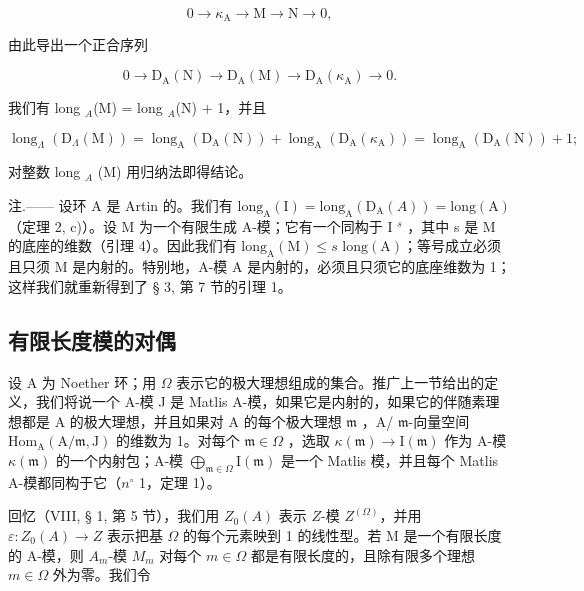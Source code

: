 \[
0 \rightarrow \kappa_ {\mathrm{A}} \longrightarrow \mathrm{M} \longrightarrow \mathrm{N} \rightarrow 0,
\]

由此导出一个正合序列

\[
0 \rightarrow \mathrm{D} _ {\mathrm{A}} (\mathrm{N}) \longrightarrow \mathrm{D} _ {\mathrm{A}} (\mathrm{M}) \longrightarrow \mathrm{D} _ {\mathrm{A}} (\kappa_ {\mathrm{A}}) \rightarrow 0.
\]

我们有 long \(_{A}\)(M) = long \(_{A}\)(N) + 1，并且

\[
\operatorname{long} _ {\Lambda} \left(\mathrm{D} _ {\Lambda} (\mathrm{M})\right) = \operatorname{long} _ {\mathrm{A}} \left(\mathrm{D} _ {\mathrm{A}} (\mathrm{N})\right) + \operatorname{long} _ {\mathrm{A}} \left(\mathrm{D} _ {\mathrm{A}} \left(\kappa_ {\mathrm{A}}\right)\right) = \operatorname{long} _ {\mathrm{A}} \left(\mathrm{D} _ {\mathrm{A}} (\mathrm{N})\right) + 1;
\]

对整数 long \(_{A}\) (M) 用归纳法即得结论。

注.—— 设环 A 是 Artin 的。我们有 \(\text{long}_{\text{A}}(\text{I}) = \text{long}_{\text{A}}(\text{D}_{\text{A}}(A)) = \text{long}(\text{A})\)（定理 2, c)）。设 M 为一个有限生成 A-模；它有一个同构于 I \(^{s}\) ，其中 s 是 M 的底座的维数（引理 4）。因此我们有 \(\text{long}_{\text{A}}(\text{M}) \leqslant s \text{ long}(\text{A})\)；等号成立必须且只须 M 是内射的。特别地，A-模 A 是内射的，必须且只须它的底座维数为 1；这样我们就重新得到了 § 3, 第 7 节的引理 1。

\subsection{有限长度模的对偶}

设 A 为 Noether 环；用 \(\Omega\) 表示它的极大理想组成的集合。推广上一节给出的定义，我们将说一个 A-模 J 是 Matlis A-模，如果它是内射的，如果它的伴随素理想都是 A 的极大理想，并且如果对 A 的每个极大理想 \(\mathfrak{m}\) ，A/ \(\mathfrak{m}\)-向量空间 \(\mathrm{Hom}_{\mathrm{A}}(\mathrm{A}/\mathfrak{m},\mathrm{J})\) 的维数为 1。对每个 \(\mathfrak{m} \in \Omega\) ，选取 \(\kappa(\mathfrak{m}) \to \mathrm{I}(\mathfrak{m})\) 作为 A-模 \(\kappa(\mathfrak{m})\) 的一个内射包；A-模 \(\bigoplus_{\mathfrak{m} \in \Omega} \mathrm{I}(\mathfrak{m})\) 是一个 Matlis 模，并且每个 Matlis A-模都同构于它（\(n^{\circ}\) 1，定理 1）。

回忆（VIII, § 1, 第 5 节），我们用 \(Z_0(A)\) 表示 \(Z\)-模 \(Z^{(\Omega)}\)，并用 \(\varepsilon : Z_0(A) \to Z\) 表示把基 \(\Omega\) 的每个元素映到 1 的线性型。若 M 是一个有限长度的 A-模，则 \(A_m\)-模 \(M_m\) 对每个 \(m \in \Omega\) 都是有限长度的，且除有限多个理想 \(m \in \Omega\) 外为零。我们令

